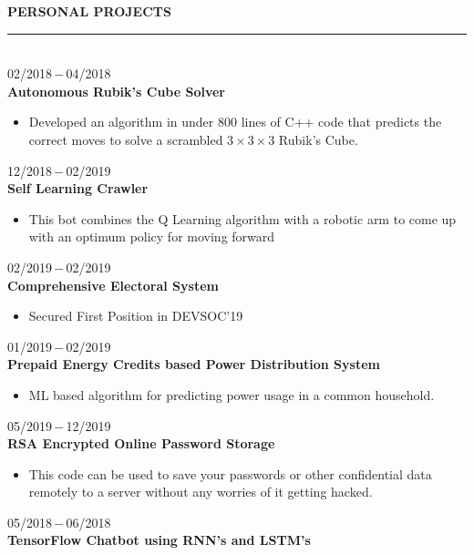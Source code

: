 \documentclass[a4paper, 12pt]{article}
\begin{document}
    \begin{flushleft}
        \textbf{PERSONAL PROJECTS}\\\noindent\rule{\textwidth}{1pt}\\02/2018\,$-$\,04/2018\\\textbf{Autonomous Rubik's Cube Solver}\\\begin{itemize}
            \item Developed an algorithm in under 800 lines of C++ code that predicts the correct moves to solve a scrambled $3\times3\times3$ Rubik's Cube.
        \end{itemize}
        
        12/2018\,$-$\,02/2019\\
        \textbf{Self Learning Crawler}\\\begin{itemize}
            \item This bot combines the Q Learning algorithm with a robotic arm to come up with an optimum policy for moving forward
        \end{itemize}
        
        02/2019\,$-$\,02/2019\\
        \textbf{Comprehensive Electoral System}\\\begin{itemize}
            \item Secured First Position in DEVSOC'19
        \end{itemize}
        
        01/2019\,$-$\,02/2019\\
        \textbf{Prepaid Energy Credits based Power Distribution System}\\\begin{itemize}
            \item ML based algorithm for predicting power usage in a common household.
        \end{itemize}
        
        05/2019\,$-$\,12/2019\\
        \textbf{RSA Encrypted Online Password Storage}\begin{itemize}
            \item This code can be used to save your passwords or other confidential data remotely to a server without any worries of it getting hacked.
        \end{itemize}
        
        05/2018\,$-$\,06/2018\\
        \textbf{TensorFlow Chatbot using RNN's and LSTM's}
    \end{flushleft}
    
\end{document}
